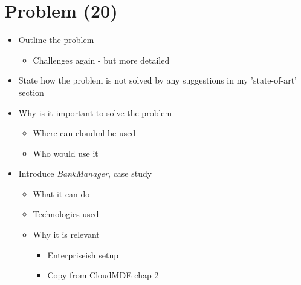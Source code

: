 \section{Problem (20)}

\begin{itemize}
  \item Outline the problem
    \begin{itemize}
      \item Challenges again - but more detailed
    \end{itemize}
  \item State how the problem is not solved by any suggestions in my 'state-of-art' section
  \item Why is it important to solve the problem
  \begin{itemize}
    \item Where can cloudml be used
    \item Who would use it
  \end{itemize}
  \item Introduce \emph{BankManager}, case study
  \begin{itemize}
    \item What it can do
    \item Technologies used
    \item Why it is relevant
      \begin{itemize}
        \item Enterpriseish setup
        \item Copy from CloudMDE chap 2
      \end{itemize}
  \end{itemize}
\end{itemize}
